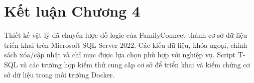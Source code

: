 \section*{Kết luận Chương 4}
Thiết kế vật lý đã chuyển lược đồ logic của FamilyConnect thành cơ sở dữ liệu triển khai trên Microsoft SQL Server 2022. Các kiểu dữ liệu, khóa ngoại, chính sách xóa/cập nhật và chỉ mục được lựa chọn phù hợp với nghiệp vụ. Script T-SQL và các trường hợp kiểm thử cung cấp cơ sở để triển khai và kiểm chứng cơ sở dữ liệu trong môi trường Docker.
